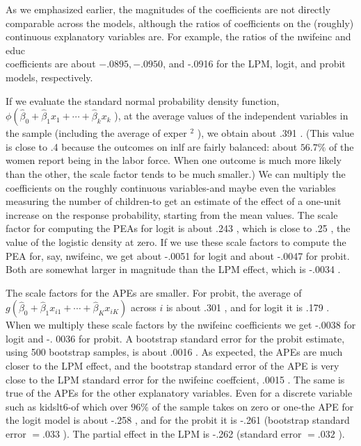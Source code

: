 \documentclass[10pt]{article}
\begin{document}
As we emphasized earlier, the magnitudes of the coefficients are not directly comparable across the models, although the ratios of coefficients on the (roughly) continuous explanatory variables are. For example, the ratios of the nwifeinc and educ\\
coefficients are about $-.0895,-.0950$, and -.0916 for the LPM, logit, and probit models, respectively.

If we evaluate the standard normal probability density function, $\phi\left(\hat{\beta}_{0}+\hat{\beta}_{1} x_{1}+\cdots\right. +\hat{\beta}_{k} x_{k}$ ), at the average values of the independent variables in the sample (including the average of exper ${ }^{2}$ ), we obtain about .391 . (This value is close to .4 because the outcomes on inlf are fairly balanced: about $56.7 \%$ of the women report being in the labor force. When one outcome is much more likely than the other, the scale factor tends to be much smaller.) We can multiply the coefficients on the roughly continuous variables-and maybe even the variables measuring the number of children-to get an estimate of the effect of a one-unit increase on the response probability, starting from the mean values. The scale factor for computing the PEAs for logit is about .243 , which is close to .25 , the value of the logistic density at zero. If we use these scale factors to compute the PEA for, say, nwifeinc, we get about -.0051 for logit and about -.0047 for probit. Both are somewhat larger in magnitude than the LPM effect, which is -.0034 .

The scale factors for the APEs are smaller. For probit, the average of $g\left(\hat{\beta}_{0}+\hat{\beta}_{1} x_{i 1}+\cdots+\hat{\beta}_{K} x_{i K}\right)$ across $i$ is about .301 , and for logit it is .179 . When we multiply these scale factors by the nwifeinc coefficients we get -.0038 for logit and -. 0036 for probit. A bootstrap standard error for the probit estimate, using 500 bootstrap samples, is about .0016 . As expected, the APEs are much closer to the LPM effect, and the bootstrap standard error of the APE is very close to the LPM standard error for the nwifeinc coeffcient, .0015 . The same is true of the APEs for the other explanatory variables. Even for a discrete variable such as kidslt6-of which over $96 \%$ of the sample takes on zero or one-the APE for the logit model is about -.258 , and for the probit it is -.261 (bootstrap standard error $=.033$ ). The partial effect in the LPM is -.262 (standard error $=.032$ ).
\end{document}
